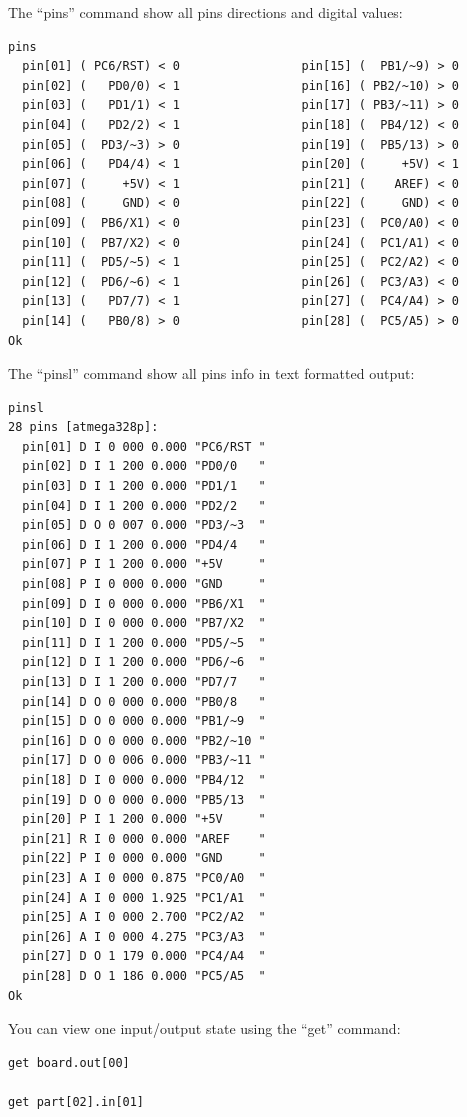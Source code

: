 The ``pins'' command show all pins directions and digital values:
\begin{verbatim}
pins
  pin[01] ( PC6/RST) < 0                 pin[15] (  PB1/~9) > 0 
  pin[02] (   PD0/0) < 1                 pin[16] ( PB2/~10) > 0 
  pin[03] (   PD1/1) < 1                 pin[17] ( PB3/~11) > 0 
  pin[04] (   PD2/2) < 1                 pin[18] (  PB4/12) < 0 
  pin[05] (  PD3/~3) > 0                 pin[19] (  PB5/13) > 0 
  pin[06] (   PD4/4) < 1                 pin[20] (     +5V) < 1 
  pin[07] (     +5V) < 1                 pin[21] (    AREF) < 0 
  pin[08] (     GND) < 0                 pin[22] (     GND) < 0 
  pin[09] (  PB6/X1) < 0                 pin[23] (  PC0/A0) < 0 
  pin[10] (  PB7/X2) < 0                 pin[24] (  PC1/A1) < 0 
  pin[11] (  PD5/~5) < 1                 pin[25] (  PC2/A2) < 0 
  pin[12] (  PD6/~6) < 1                 pin[26] (  PC3/A3) < 0 
  pin[13] (   PD7/7) < 1                 pin[27] (  PC4/A4) > 0 
  pin[14] (   PB0/8) > 0                 pin[28] (  PC5/A5) > 0 
Ok
\end{verbatim}

The ``pinsl'' command show all pins info in text formatted output:
\begin{verbatim}
pinsl
28 pins [atmega328p]:
  pin[01] D I 0 000 0.000 "PC6/RST " 
  pin[02] D I 1 200 0.000 "PD0/0   " 
  pin[03] D I 1 200 0.000 "PD1/1   " 
  pin[04] D I 1 200 0.000 "PD2/2   " 
  pin[05] D O 0 007 0.000 "PD3/~3  " 
  pin[06] D I 1 200 0.000 "PD4/4   " 
  pin[07] P I 1 200 0.000 "+5V     " 
  pin[08] P I 0 000 0.000 "GND     " 
  pin[09] D I 0 000 0.000 "PB6/X1  " 
  pin[10] D I 0 000 0.000 "PB7/X2  " 
  pin[11] D I 1 200 0.000 "PD5/~5  " 
  pin[12] D I 1 200 0.000 "PD6/~6  " 
  pin[13] D I 1 200 0.000 "PD7/7   " 
  pin[14] D O 0 000 0.000 "PB0/8   " 
  pin[15] D O 0 000 0.000 "PB1/~9  " 
  pin[16] D O 0 000 0.000 "PB2/~10 " 
  pin[17] D O 0 006 0.000 "PB3/~11 " 
  pin[18] D I 0 000 0.000 "PB4/12  " 
  pin[19] D O 0 000 0.000 "PB5/13  " 
  pin[20] P I 1 200 0.000 "+5V     " 
  pin[21] R I 0 000 0.000 "AREF    " 
  pin[22] P I 0 000 0.000 "GND     " 
  pin[23] A I 0 000 0.875 "PC0/A0  " 
  pin[24] A I 0 000 1.925 "PC1/A1  " 
  pin[25] A I 0 000 2.700 "PC2/A2  " 
  pin[26] A I 0 000 4.275 "PC3/A3  " 
  pin[27] D O 1 179 0.000 "PC4/A4  " 
  pin[28] D O 1 186 0.000 "PC5/A5  " 
Ok
\end{verbatim}


You can view one input/output state using the ``get'' command:
\begin{verbatim}
get board.out[00]

get part[02].in[01]
\end{verbatim}

